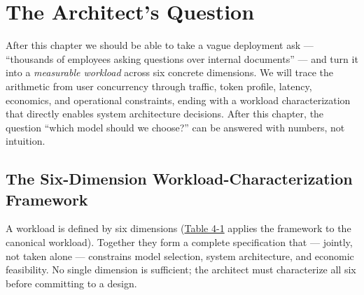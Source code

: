 \section*{The Architect's Question}\label{the-architects-question}

After this chapter we should be able to take a vague deployment ask ---
``thousands of employees asking questions over internal documents'' ---
and turn it into a \emph{measurable workload} across six concrete
dimensions. We will trace the arithmetic from user concurrency through
traffic, token profile, latency, economics, and operational constraints,
ending with a workload characterization that directly enables system
architecture decisions. After this chapter, the question ``which model
should we choose?'' can be answered with numbers, not intuition.

\label{concept}


\subsection{The Six-Dimension Workload-Characterization
Framework}\label{the-six-dimension-workload-characterization-framework}

A workload is defined by six dimensions (\hyperref[tab:4.1]{Table 4-1} applies the framework
to the canonical workload). Together they form a complete specification
that --- jointly, not taken alone --- constrains model selection, system
architecture, and economic feasibility. No single dimension is
sufficient; the architect must characterize all six before committing to
a design.

